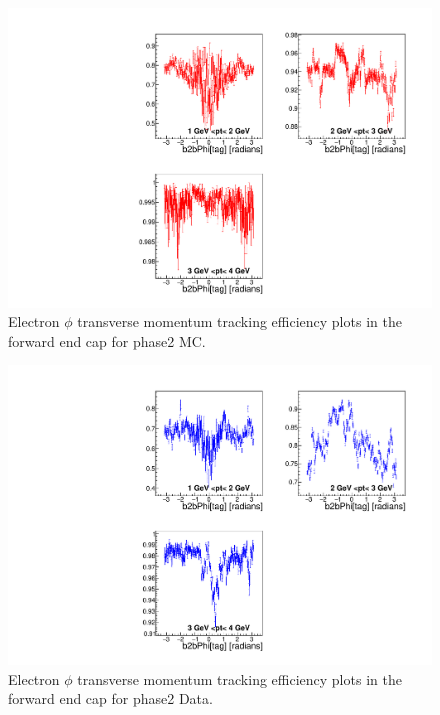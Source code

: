 \documentclass[a4paper,11pt,twosided,final,german,openbib,pdftex,listof=totoc,bibliography=totoc]{scrbook}
\begin{document}
\begin{appendix}
\begin{figure}[!htbp]
	\centering
	\includegraphics[width=\textwidth]{Plots/master/xPtMPhiemFC_MC}
	\caption[Transverse Momentum $\phi$ Electron Forward End Cap Efficiency Phase2 MC]{Electron $\phi$ transverse momentum tracking efficiency plots in the forward end cap for phase2 MC.}
	\label{plt:PtMPhiemFC_MC}
\end{figure}


\begin{figure}[!htbp]
	\centering
	\includegraphics[width=\textwidth]{Plots/master/xPtMPhiemFC_Data}
	\caption[Transverse Momentum $\phi$ Electron Forward End Cap Efficiency Phase2 Data]{Electron $\phi$ transverse momentum tracking efficiency plots in the forward end cap for phase2 Data.}
	\label{plt:PtMPhiemFC_Data}
\end{figure}



\end{appendix}
\end{document}
